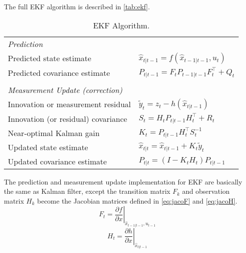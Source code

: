The full \gls{EKF} algorithm is described in \autoref{tab:ekf}.
\begin{table}[h]
\begin{adjustbox}{max width=\textwidth}
  \centering
  \begin{tabular}{ll}
 \textit{Prediction} & \\
Predicted state estimate & $\hat{x}_{t|t-1} = f(\hat{x}_{t-1|t-1}, u_{t})$ \\
Predicted covariance estimate & $P_{t|t-1} =  {{F_{t}}} P_{t-1|t-1}{ {F_{t}^\top}} + Q_{t}$ \\
&\\
\textit{Measurement Update (correction)} & \\
Innovation or measurement residual & $\tilde{y}_{t} = z_{t} - h(\hat{x}_{t|t-1})$ \\
Innovation (or residual) covariance & $S_{t} = {{H_{t}}}P_{t|t-1}{{H_{t}^\top}} + R_{t}$ \\
Near-optimal Kalman gain & $K_{t} = P_{t|t-1}{{H_{t}^\top}}S_{t}^{-1}$ \\
Updated state estimate & $\hat{x}_{t|t} = \hat{x}_{t|t-1} + K_{t}\tilde{y}_{t}$ \\
Updated covariance estimate & $P_{t|t} = (I - K_{t} {{H_{t}}}) P_{t|t-1}$ \\
   
  \end{tabular}
  \end{adjustbox}
  \caption[Extended Kalman Filter Algorithm.]{\gls{EKF} Algorithm.}
  \label{tab:ekf}
\end{table}

The prediction and measurement update implementation for \gls{EKF} are basically the same as Kalman filter, except the transition matrix $F_{k}$ and observation matrix $H_{k}$ become the Jacobian matrices defined in \autoref{eq:jacoF} and \autoref{eq:jacoH}. \\
\begin{equation}
\label{eq:jacoF}
{{F_{t}}} = \left . \frac{\partial f}{\partial x } \right \vert _{\hat{x}_{t-1|t-1},u_{t-1}}
\end{equation}
\begin{equation}
\label{eq:jacoH}
{{H_{t}}} = \left . \frac{\partial h}{\partial x } \right \vert _{\hat{x}_{t|t-1}}
\end{equation}


